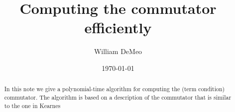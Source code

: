 
\usepackage{inputs/proof-dashed}



\usepackage{inputs/macros}



\title{Computing the commutator efficiently}
\date{\today}
\author[W.~DeMeo]{William DeMeo}
\address{University of Hawaii}


\maketitle

\renewcommand{\etaR}{\ensuremath{\eta}}



\begin{abstract}
  In this note we give a polynomial-time algorithm for computing the
  (term condition) commutator. The algorithm is based on 
  a description of the commutator that is
  similar to the one in Kearnes~\cite[p.~930]{MR1358491}
\end{abstract}


